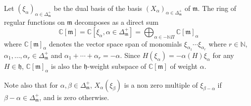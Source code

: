 \documentclass[10pt,a4paper]{amsart}
\numberwithin{equation}{section}
\theoremstyle{plain}
\theoremstyle{definition}
\theoremstyle{remark}
\begin{document}
Let $(\xi_{\alpha})_{\alpha\in \Delta_{{\mathfrak{m}}}^{+}}$ be the dual basis of 
the basis $(X_{\alpha})_{\alpha\in \Delta_{{\mathfrak{m}}}^{+}}$ of $\mathfrak{m}$.
The ring of regular functions on $\mathfrak{m}$ decomposes
as a direct sum 
$$
\mathbb{C} [\mathfrak{m}] = \mathbb{C} [\xi_{\alpha}, \alpha\in \Delta_{\mathfrak{m}}^{+}] = 
\bigoplus_{\alpha\in -\mathbb{N}\Pi} \mathbb{C} [\mathfrak{m}]_{\alpha}
$$
where 
$\mathbb{C} [\mathfrak{m}]_{\alpha}$ denotes
the vector space span of monomials  $\xi_{\alpha_{1}}\cdots \xi_{\alpha_{r}}$ where
$r\in\mathbb{N}$, $\alpha_{1},\dots ,\alpha_{r}\in\Delta_{\mathfrak{m}}^{+}$ and
$\alpha_{1}+\cdots + \alpha_{r} = -\alpha$. Since $H ( \xi_{\alpha} ) = -\alpha (H) \xi_{\alpha}$
for any $H\in\mathfrak{h}$, 
$\mathbb{C} [\mathfrak{m}]_{\alpha}$ is also the $\mathfrak{h}$-weight 
subspace of $\mathbb{C} [\mathfrak{m}]$ of weight $\alpha$.

Note also that for $\alpha,\beta \in \Delta_{\mathfrak{m}}^{+}$, 
$X_{\alpha} ( \xi_{\beta} )$ is a non zero multiple of $\xi_{\beta-\alpha}$ if  
$\beta - \alpha \in \Delta_{\mathfrak{m}}^{+}$, and is zero otherwise.
\end{document}
